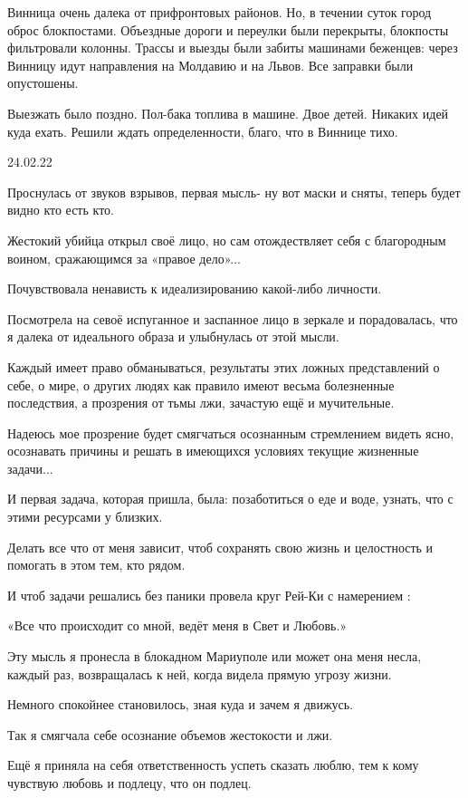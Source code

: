 Винница очень далека от прифронтовых районов. Но, в течении суток город оброс
блокпостами. Объездные дороги и переулки были перекрыты, блокпосты фильтровали
колонны. Трассы и выезды были забиты машинами беженцев: через Винницу идут
направления на Молдавию и на Львов. Все заправки были опустошены.

Выезжать было поздно. Пол-бака топлива в машине. Двое детей. Никаких идей куда
ехать. Решили ждать определенности, благо, что в Виннице тихо.


24.02.22

Проснулась от звуков взрывов, первая мысль- ну вот маски и сняты, теперь будет
видно кто есть кто.

Жестокий убийца открыл своё лицо, но сам отождествляет себя с благородным
воином, сражающимся за «правое дело»...

Почувствовала ненависть к идеализированию какой-либо личности.

Посмотрела на севоё испуганное и заспанное лицо в зеркале и порадовалась, что я
далека от идеального образа и улыбнулась от этой мысли.

Каждый имеет право обманываться, результаты этих ложных представлений о себе, о
мире, о других людях как правило имеют весьма болезненные последствия, а
прозрения от тьмы лжи, зачастую ещё и мучительные.

Надеюсь мое прозрение будет смягчаться осознанным стремлением видеть ясно,
осознавать причины и решать в имеющихся условиях текущие жизненные задачи...

И первая задача, которая пришла, была: позаботиться о еде и воде, узнать, что с
этими ресурсами у близких.

Делать все что от меня зависит, чтоб сохранять свою жизнь и целостность и
помогать в этом тем, кто рядом.

И чтоб задачи решались без паники провела круг Рей-Ки с намерением :

«Все что происходит со мной, ведёт меня в Свет и Любовь.»

Эту мысль я пронесла в блокадном Мариуполе или может она меня несла, каждый
раз, возвращалась к ней, когда видела прямую угрозу жизни.

Немного спокойнее становилось, зная куда и зачем я движусь.

Так я смягчала себе осознание объемов жестокости и лжи.

Ещё я приняла на себя ответственность успеть сказать люблю, тем к кому чувствую
любовь и подлецу, что он подлец.

